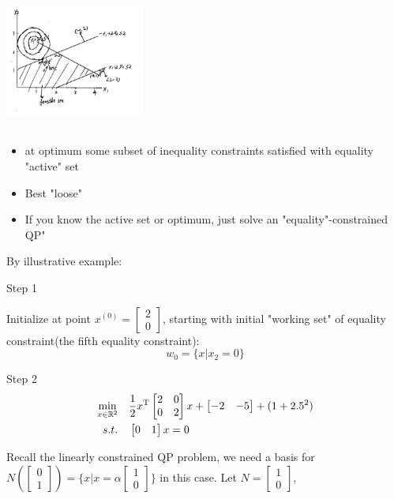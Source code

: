 \begin{marginfigure}
	\centering
	\includegraphics[width=1.8in,height=1.8in]{figures/ch07/figure1021_1.png}
\end{marginfigure}

\begin{itemize}
	\item at optimum some subset of inequality constraints satisfied with equality "active" set
	
	\item Best "loose"
	
	\item If you know the active set or optimum, just solve an "equality"-constrained QP"
\end{itemize}
By illustrative example:

Step 1

Initialize at point $x^{(0)} = \begin{bmatrix}
2\\
0
\end{bmatrix}$, starting with initial "working set" of equality constraint(the fifth equality constraint):
$$w_0 = \{x|x_2 = 0 \}$$


Step 2
 \begin{align*}
\min_{x\in \mathbb{R}^2} \quad
&
\frac{1}{2}x^{{\rm T}}
\begin{bmatrix}
2&0\\
0&2
\end{bmatrix}
x + 
\begin{bmatrix}
-2 & -5
\end{bmatrix} 
+ (1 + 2.5^2)\\
s.t.\quad &
\begin{bmatrix}
0 & 1
\end{bmatrix}
x = 0
\end{align*}


Recall the linearly constrained QP problem, we need a basis for 
$N(\begin{bmatrix} 
0\\
1
\end{bmatrix}) 
= \{x|x = \alpha
\begin{bmatrix}
1\\
0
\end{bmatrix} \}$
in this case. Let
$N=
\begin{bmatrix}
1\\
0
\end{bmatrix}$,

